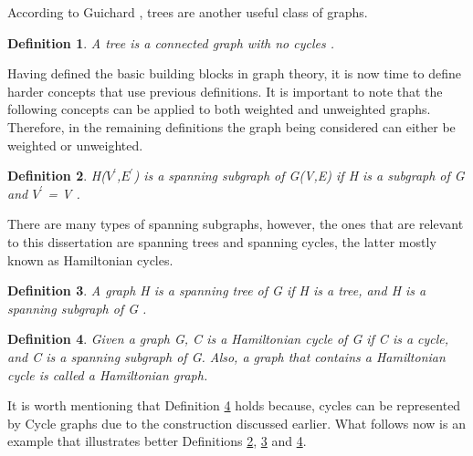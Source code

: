 \documentclass[12pt]{article}
\newtheorem{definition}{Definition}[subsection]
\numberwithin{equation}{subsection}
\numberwithin{table}{subsection}
\numberwithin{algorithm}{subsection}
\begin{document}
According to Guichard \cite{guichard_2018}, trees are another useful class of graphs.
\begin{definition}
\label{tree}
A tree is a connected graph with no cycles .
\end{definition}
Having defined the basic building blocks in graph theory, it is now time to define harder concepts that use previous definitions. It is important to note that the following concepts can be applied to both weighted and unweighted graphs. Therefore, in the remaining definitions the graph being considered can either be weighted or unweighted.
\begin{definition}
\label{spanning subgraph}
H($V^\prime$,$E^\prime$) is a spanning subgraph of G(V,E) if H is a subgraph of G and $V^\prime$ = V .
\end{definition}
There are many types of spanning subgraphs, however, the ones that are relevant to this dissertation are spanning trees and spanning cycles, the latter mostly known as Hamiltonian cycles.
\begin{definition}
A graph H is a spanning tree of G if H is a tree, and H is a spanning subgraph of G .
\label{spanning tree}
\end{definition}
\begin{definition}
\label{hamiltonian cycle}
Given a graph G, C is a Hamiltonian cycle of G if C is a cycle, and C is a spanning subgraph of G. Also, a graph that contains a Hamiltonian cycle is called a Hamiltonian graph. 
\end{definition}
It is worth mentioning that Definition \ref{hamiltonian cycle} holds because, cycles can be represented by Cycle graphs due to the construction discussed earlier. What follows now is an example that illustrates better Definitions \ref{spanning subgraph}, \ref{spanning tree} and \ref{hamiltonian cycle}. 
\end{document}
